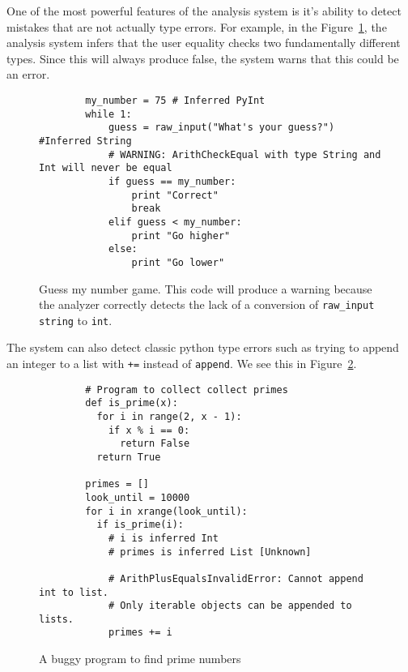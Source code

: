 \documentclass{article}[12pt]
\begin{document}
One of the most powerful features of the analysis system is it's ability to detect mistakes that are
not actually type errors. For example, in the Figure~\ref{fig:guessnum}, the analysis system infers that the
user equality checks two fundamentally different types. Since this will always produce false, the
system warns that this could be an error.

\begin{figure}
    \begin{verbatim}
        my_number = 75 # Inferred PyInt
        while 1:
            guess = raw_input("What's your guess?") #Inferred String
            # WARNING: ArithCheckEqual with type String and Int will never be equal 
            if guess == my_number:
                print "Correct"
                break
            elif guess < my_number:
                print "Go higher"
            else:
                print "Go lower"
    \end{verbatim}
    \caption{Guess my number game. This code will produce a warning because the analyzer correctly
        detects the lack of a conversion of \texttt{raw\_input} \texttt{string} to \texttt{int}.}
    \label{fig:guessnum}
\end{figure}

The system can also detect classic python type errors such as trying to append an integer to a list
with \texttt{+=} instead of \texttt{append}. We see this in Figure~\ref{fig:findprimes}.
\begin{figure}
    \begin{verbatim}
        # Program to collect collect primes
        def is_prime(x):
          for i in range(2, x - 1):
            if x % i == 0:
              return False
          return True
        
        primes = []
        look_until = 10000
        for i in xrange(look_until):
          if is_prime(i):
            # i is inferred Int
            # primes is inferred List [Unknown]

            # ArithPlusEqualsInvalidError: Cannot append int to list. 
            # Only iterable objects can be appended to lists.
            primes += i
    \end{verbatim}
    \caption{A buggy program to find prime numbers}
    \label{fig:findprimes}
\end{figure}
\end{document}
